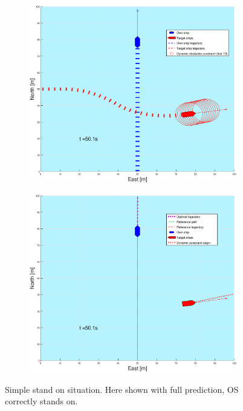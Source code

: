 \begin{figure}[ht!]
\begin{subfigure}[b]{0.499\textwidth}
    \end{subfigure}
    \hfill
    \\
    \begin{subfigure}[b]{0.49\textwidth}
        \centering
        \includegraphics[width=\textwidth]{Images/Figures/enkel_SO/_Simple_0fig1_time=50}
    \end{subfigure}
    \hfill
    \begin{subfigure}[b]{0.499\textwidth}
        \centering
        \includegraphics[width=\textwidth]{Images/Figures/enkel_SO/_Simple_0fig999_time=50}
    \end{subfigure}
    \hfill
    \caption{Simple stand on situation. Here shown with full prediction, \gls{OS} correctly stands on.}
    \label{FIG: simple SO full pred}
\end{figure}%
